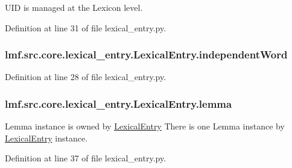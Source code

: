 U\+I\+D is managed at the Lexicon level. 



Definition at line 31 of file lexical\+\_\+entry.\+py.

\hypertarget{classlmf_1_1src_1_1core_1_1lexical__entry_1_1_lexical_entry_a6e84227c5c4a0d4d6574f3daa19ebac4}{
\subsubsection[{independent\+Word}]{\setlength{\rightskip}{0pt plus 5cm}lmf.\+src.\+core.\+lexical\+\_\+entry.\+Lexical\+Entry.\+independent\+Word}}\label{classlmf_1_1src_1_1core_1_1lexical__entry_1_1_lexical_entry_a6e84227c5c4a0d4d6574f3daa19ebac4}


Definition at line 28 of file lexical\+\_\+entry.\+py.

\hypertarget{classlmf_1_1src_1_1core_1_1lexical__entry_1_1_lexical_entry_a25e285f1f40cf8c4a17d021c2d2b878f}{
\subsubsection[{lemma}]{\setlength{\rightskip}{0pt plus 5cm}lmf.\+src.\+core.\+lexical\+\_\+entry.\+Lexical\+Entry.\+lemma}}\label{classlmf_1_1src_1_1core_1_1lexical__entry_1_1_lexical_entry_a25e285f1f40cf8c4a17d021c2d2b878f}


Lemma instance is owned by \hyperlink{classlmf_1_1src_1_1core_1_1lexical__entry_1_1_lexical_entry}{Lexical\+Entry} There is one Lemma instance by \hyperlink{classlmf_1_1src_1_1core_1_1lexical__entry_1_1_lexical_entry}{Lexical\+Entry} instance. 



Definition at line 37 of file lexical\+\_\+entry.\+py.

